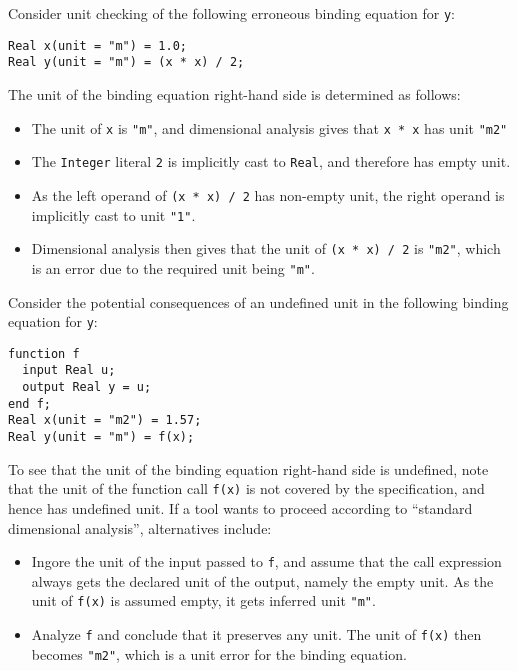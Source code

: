 \begin{example}
Consider unit checking of the following erroneous binding equation for \lstinline!y!:
\begin{lstlisting}[language=modelica]
Real x(unit = "m") = 1.0;
Real y(unit = "m") = (x * x) / 2;
\end{lstlisting}
The unit of the binding equation right-hand side is determined as follows:
\begin{itemize}
\item The unit of \lstinline!x! is \lstinline!"m"!, and dimensional analysis gives that \lstinline!x * x! has unit \lstinline!"m2"!
\item The \lstinline!Integer! literal \lstinline!2! is implicitly cast to \lstinline!Real!, and therefore has empty unit.
\item As the left operand of \lstinline!(x * x) / 2! has non-empty unit, the right operand is implicitly cast to unit \lstinline!"1"!.
\item Dimensional analysis then gives that the unit of \lstinline!(x * x) / 2! is \lstinline!"m2"!, which is an error due to the required unit being \lstinline!"m"!.
\end{itemize}
\end{example}

\begin{example}
Consider the potential consequences of an undefined unit in the following binding equation for \lstinline!y!:
\begin{lstlisting}[language=modelica]
function f
  input Real u;
  output Real y = u;
end f;
Real x(unit = "m2") = 1.57;
Real y(unit = "m") = f(x);
\end{lstlisting}
To see that the unit of the binding equation right-hand side is undefined, note that the unit of the function call \lstinline!f(x)! is not covered by the specification, and hence has undefined unit.
If a tool wants to proceed according to ``standard dimensional analysis'', alternatives include:
\begin{itemize}
\item
  Ingore the unit of the input passed to \lstinline!f!, and assume that the call expression always gets the declared unit of the output, namely the empty unit.
  As the unit of \lstinline!f(x)! is assumed empty, it gets inferred unit \lstinline!"m"!.
\item
  Analyze \lstinline!f! and conclude that it preserves any unit.
  The unit of \lstinline!f(x)! then becomes \lstinline!"m2"!, which is a unit error for the binding equation.
\end{itemize}
\end{example}
